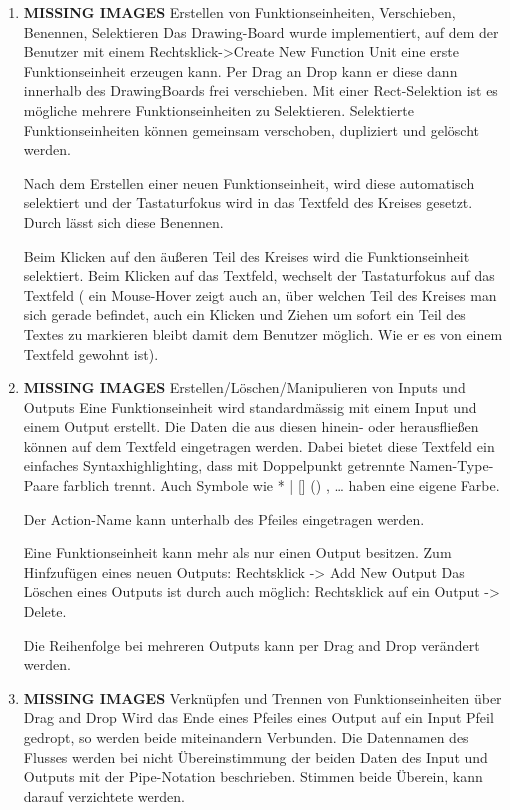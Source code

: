 \documentclass[11pt]{article}
\begin{document}
\begin{enumerate}
\item {\bfseries\sffamily MISSING IMAGES} Erstellen von Funktionseinheiten, Verschieben, Benennen, Selektieren
\label{sec:orgheadline15}
Das Drawing-Board wurde implementiert, auf dem der Benutzer mit einem
Rechtsklick->Create New Function Unit eine erste Funktionseinheit erzeugen
kann. Per Drag an Drop kann er diese dann innerhalb des DrawingBoards frei
verschieben. Mit einer Rect-Selektion ist es mögliche mehrere
Funktionseinheiten zu Selektieren. Selektierte Funktionseinheiten können
gemeinsam verschoben, dupliziert und gelöscht werden.

Nach dem Erstellen einer neuen Funktionseinheit, wird diese automatisch
selektiert und der Tastaturfokus wird in das Textfeld des Kreises gesetzt.
Durch lässt sich diese Benennen.

Beim Klicken auf den äußeren Teil des Kreises wird die Funktionseinheit
selektiert. Beim Klicken auf das Textfeld, wechselt der Tastaturfokus auf
das Textfeld ( ein Mouse-Hover zeigt auch an, über welchen Teil des Kreises
man sich gerade befindet, auch ein Klicken und Ziehen um sofort ein Teil
des Textes zu markieren bleibt damit dem Benutzer möglich. Wie er es von
einem Textfeld gewohnt ist).


\item {\bfseries\sffamily MISSING IMAGES} Erstellen/Löschen/Manipulieren von Inputs und Outputs
\label{sec:orgheadline16}
Eine Funktionseinheit wird standardmässig mit einem Input und einem Output
erstellt. Die Daten die aus diesen hinein- oder herausfließen können auf
dem Textfeld eingetragen werden. Dabei bietet diese Textfeld ein einfaches
Syntaxhighlighting, dass mit Doppelpunkt getrennte Namen-Type-Paare
farblich trennt. Auch Symbole wie * | [] () , \ldots{} haben eine eigene Farbe.

Der Action-Name kann unterhalb des Pfeiles eingetragen werden.

Eine Funktionseinheit kann mehr als nur einen Output besitzen.
Zum Hinfzufügen eines neuen Outputs: Rechtsklick -> Add New Output
Das Löschen eines Outputs ist durch auch möglich: Rechtsklick auf ein
Output -> Delete.    

Die Reihenfolge bei mehreren Outputs kann per Drag and Drop verändert werden.

\item {\bfseries\sffamily MISSING IMAGES} Verknüpfen und Trennen von Funktionseinheiten über Drag and Drop
\label{sec:orgheadline17}
Wird das Ende eines Pfeiles eines Output auf ein Input Pfeil gedropt, so werden beide
miteinandern Verbunden. Die Datennamen des Flusses werden bei nicht
Übereinstimmung der beiden Daten des Input und Outputs mit
der Pipe-Notation beschrieben. Stimmen beide Überein, kann darauf
verzichtete werden.


\end{enumerate}
\end{document}
